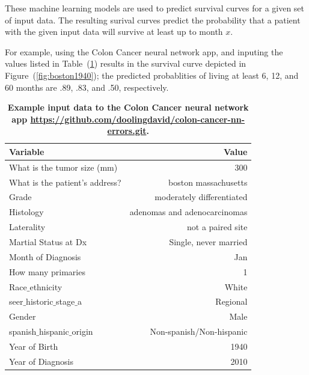 \documentclass[10pt,letterpaper]{article}
\begin{document}
These machine learning models are used to predict survival curves for a given set of input data. 
The resulting surival curves predict the probability that a patient with the given input data will survive at least up to month $x$.

 For example, using the Colon Cancer neural network app, and 
inputing the values listed in Table~(\ref{tab:boston1940}) results in the survival curve depicted in Figure~(\ref{fig:boston1940}); the predicted probablities of living 
at least 6, 12, and 60 months are .89, .83, and .50, respectively.



\begin{table}[!ht]
\begin{adjustwidth}{-2.25in}{0in} %
\caption{\bf{Example input data to the Colon Cancer neural network app \url{https://github.com/doolingdavid/colon-cancer-nn-errors.git}.}}
\begin{tabular}{lr}
\toprule
  Variable  & Value \\ 
\midrule
  What is the tumor size (mm) & 300 \\  
  What is the patient's address? & boston massachusetts \\ 
  Grade & moderately differentiated \\  
  Histology & adenomas and adenocarcinomas \\ 
  Laterality & not a paired site \\  
 Martial Status at Dx & Single, never married \\  
 Month of Diagnosis & Jan \\  
 How many primaries & 1 \\  
  Race$\_$ethnicity & White \\  
  seer$\_$historic$\_$stage$\_$a  & Regional \\ 
  Gender & Male \\  
  spanish$\_$hispanic$\_$origin & Non-spanish/Non-hispanic \\ 
 Year of Birth & 1940 \\  
  Year of Diagnosis & 2010 \\
\bottomrule
\end{tabular}
\label{tab:boston1940}
\end{adjustwidth}
\end{table}
\end{document}
